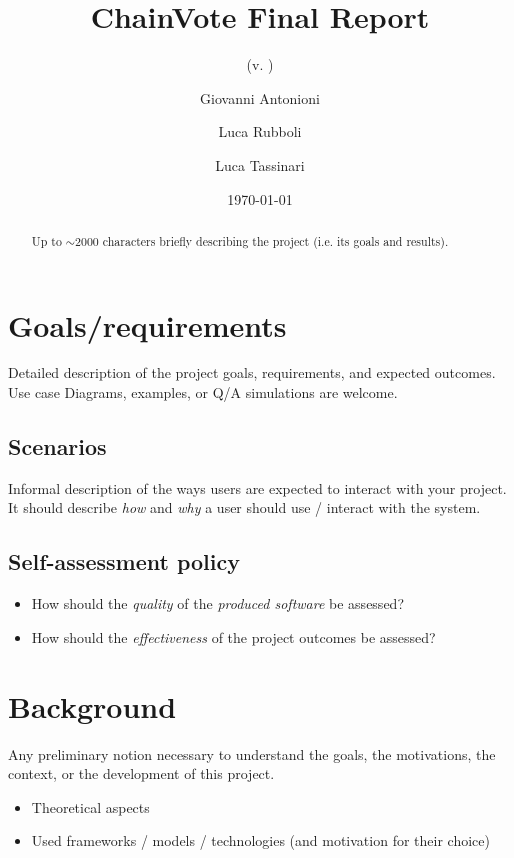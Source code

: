 \documentclass{scrartcl}
\title{\LARGE
    ChainVote Final Report
}
\subtitle{(v. \version)}
\author{
    Giovanni Antonioni \\ \emailaddr{author1@email.it}
    \and 
    Luca Rubboli \\ \emailaddr{author2@gmail.com} 
    \and 
    Luca Tassinari \\ \emailaddr{author3@unibo.it}
}
\date{\today}
\begin{document}
\maketitle

\begin{abstract}
    Up to $\sim$2000 characters briefly describing the project (i.e. its goals and results).
\end{abstract}

\section{Goals/requirements}

Detailed description of the project goals, requirements, and expected outcomes.
%
Use case Diagrams, examples, or Q/A simulations are welcome.

\subsection{Scenarios}

Informal description of the ways users are expected to interact with your project.
%
It should describe \emph{how} and \emph{why} a user should use / interact with the system.

\subsection{Self-assessment policy}

\begin{itemize}
    \item How should the \emph{quality} of the \emph{produced software} be assessed?
    
    \item How should the \emph{effectiveness} of the project outcomes be assessed?
\end{itemize}

\section{Background}

Any preliminary notion necessary to understand the goals, the motivations, the context, or the development of this project.
%
\begin{itemize}
    \item Theoretical aspects
    
    \item Used frameworks / models / technologies (and motivation for their choice)
\end{itemize}
\end{document}
